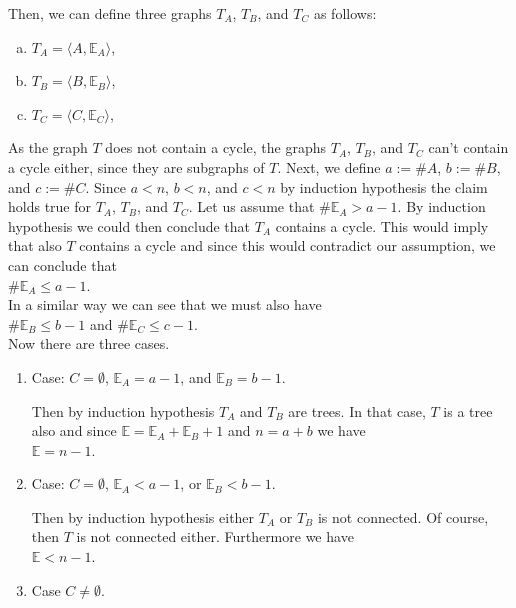 \begin{enumerate}
\begin{enumerate}[(a)]
  \end{enumerate}
  Then, we can define three graphs $T_A$, $T_B$, and $T_C$ as follows:
  \begin{enumerate}[(a)]
  \item $T_A = \langle A, \mathbb{E}_A \rangle$,
  \item $T_B = \langle B, \mathbb{E}_B \rangle$,
  \item $T_C = \langle C, \mathbb{E}_C \rangle$,
  \end{enumerate}
  As the graph $T$ does not contain a cycle, the graphs $T_A$, $T_B$, and $T_C$ can't contain a cycle either,
  since they are subgraphs of $T$.  Next, we define $a := \# A$, $b := \# B$, and $c := \# C$.
  Since $a < n$, $b < n$, and $c < n$ by induction hypothesis the claim holds true for  $T_A$, $T_B$, and
  $T_C$.  Let us assume that $\# \mathbb{E}_A > a - 1$.  By induction hypothesis we could then conclude that
  $T_A$ contains a cycle.  This would imply that also $T$ contains a cycle and since this would contradict our
  assumption, we can conclude that
  \\[0.2cm]
  \hspace*{1.3cm}
  $\# \mathbb{E}_A \leq a - 1$.
  \\[0.2cm]
  In a similar way we can see that we must also have
  \\[0.2cm]
  \hspace*{1.3cm}
  $\# \mathbb{E}_B \leq b - 1$ \quad and \quad $\# \mathbb{E}_C \leq c - 1$.
  \\[0.2cm]
  Now there are three cases.
  \begin{enumerate}
  \item Case: $C = \emptyset$, $\mathbb{E}_A = a - 1$, and $\mathbb{E}_B = b - 1$.
    
    Then by induction hypothesis $T_A$ and $T_B$ are trees.  In that case, $T$ is a tree also
    and since $\mathbb{E} = \mathbb{E}_A + \mathbb{E}_B + 1$ and $n = a + b$ we have
    \\[0.2cm]
    \hspace*{1.3cm}
    $\mathbb{E} = n -1$. \green{$\surd$}
  \item Case: $C = \emptyset$, $\mathbb{E}_A < a - 1$, or $\mathbb{E}_B < b - 1$.
    
    Then by induction hypothesis either $T_A$ or $T_B$ is not connected.  Of course, then $T$ is not connected either.
    Furthermore we have 
    \\[0.2cm]
    \hspace*{1.3cm}
    $\mathbb{E} < n - 1$. \green{$\surd$} 
  \item Case $C \not= \emptyset$.


\end{enumerate}
\end{enumerate}
